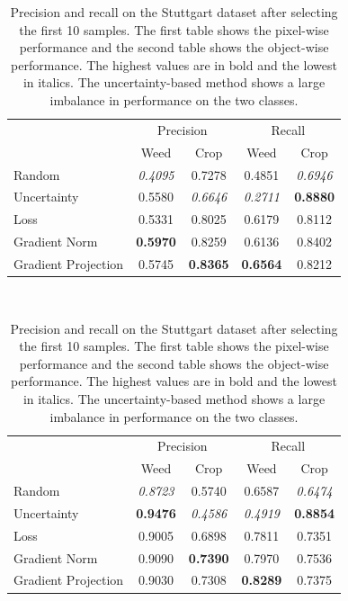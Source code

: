 \documentclass[letterpaper, 10 pt, conference]{ieeeconf}  %
\begin{document}
 


       \begin{table}
        \vspace{1em}
        \centering
      \caption{Precision and recall on the Stuttgart dataset after selecting the first 10 samples. The first table shows the pixel-wise performance and the second table shows the object-wise performance. The highest values are in bold and the lowest in italics. The uncertainty-based method shows a large imbalance in performance on the two classes.}
        \begin{tabular}{@{}lcccc@{}} 
            \toprule
            & \multicolumn{2}{c}{Precision} & \multicolumn{2}{c}{Recall}\\ 
           \cmidrule{2-5} 
               & Weed & Crop & Weed & Crop \\ 
            \midrule 
    		  Random & \textit{0.4095} & 0.7278 & 0.4851 & \textit{0.6946}  \\ \addlinespace
    		  Uncertainty & 0.5580 & \textit{0.6646} & \textit{0.2711} & \textbf{0.8880}  \\ \addlinespace
    		  Loss & 0.5331 & 0.8025 & 0.6179 & 0.8112  \\ \addlinespace
    		  Gradient Norm & \textbf{0.5970} & 0.8259 & 0.6136 & 0.8402  \\ \addlinespace
    		  Gradient Projection & 0.5745 & \textbf{0.8365} & \textbf{0.6564} & 0.8212  \\ 
            \bottomrule
        \end{tabular}
           ~\\[1mm]
                \begin{tabular}{@{}lcccc@{}} 
            \toprule
            & \multicolumn{2}{c}{Precision} & \multicolumn{2}{c}{Recall}\\ 
           \cmidrule{2-5} 
               & Weed & Crop & Weed & Crop \\ 
            \midrule 
    		  Random & \textit{0.8723} & 0.5740 & 0.6587 & \textit{0.6474}  \\ \addlinespace
    		  Uncertainty & \textbf{0.9476} & \textit{0.4586} & \textit{0.4919} & \textbf{0.8854}  \\ \addlinespace
    		  Loss & 0.9005 & 0.6898 & 0.7811 & 0.7351  \\ \addlinespace
    		  Gradient Norm & 0.9090 & \textbf{0.7390} & 0.7970 & 0.7536  \\ \addlinespace
    		  Gradient Projection & 0.9030 & 0.7308 & \textbf{0.8289} & 0.7375  \\ 
            \bottomrule
        \end{tabular}
        \label{tab:performance_10_stuttgart}
    \end{table}
   
\end{document}
